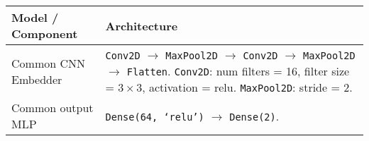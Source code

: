 \begin{tabular}{p{}p{}}
    \toprule
    Model / Component & Architecture \\ \hline\hline

    Common CNN \newline Embedder & \texttt{Conv2D} $\to$ \texttt{MaxPool2D} $\to$ \texttt{Conv2D} $\to$ \texttt{MaxPool2D} $\to$ \texttt{Flatten}. \newline
                        \texttt{Conv2D}: num filters = 16, filter size = $3 \times 3$, activation = relu. \newline
                        \texttt{MaxPool2D}: stride = 2. \\\hline
    Common output MLP & \texttt{Dense(64, `relu')} $\to$ \texttt{Dense(2)}. \\ \hline\hline


\end{tabular}
